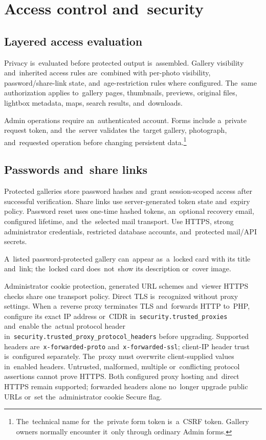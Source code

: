 \documentclass[11pt,a4paper]{article}
\newcommand{\codeword}[1]{\nolinkurl{#1}}
\begin{document}
\section{Access control and~security}
\label{sec:security}

\subsection{Layered access evaluation}

Privacy is~evaluated before protected output is~assembled. Gallery visibility
and~inherited access rules are~combined with per-photo visibility,
password/share-link state, and~age-restriction rules where configured. The~same
authorization applies to~gallery pages, thumbnails, previews, original files,
lightbox metadata, maps, search results, and~downloads.

Admin operations require an~authenticated account. Forms include a~private
request token, and~the~server validates the~target gallery, photograph,
and~requested operation before changing persistent data.\footnote{The~technical
name for~the~private form token is~a~CSRF token. Gallery owners normally
encounter it~only through ordinary Admin forms.}

\subsection{Passwords and~share links}

Protected galleries store password hashes and~grant session-scoped access after
successful verification. Share links use server-generated token state and~expiry
policy. Password reset uses one-time hashed tokens, an~optional recovery email,
configured lifetime, and~the~selected mail transport. Use HTTPS, strong
administrator credentials, restricted database accounts, and~protected mail/API
secrets.

A~listed password-protected gallery can~appear as~a~locked card with its title
and~link; the~locked card does~not~show its description or~cover image.

Administrator cookie protection, generated URL schemes and~viewer HTTPS checks
share one transport policy. Direct TLS is~recognized without proxy settings.
When a~reverse proxy terminates TLS and~forwards HTTP to~PHP, configure its
exact IP address or~CIDR in~\codeword{security.trusted_proxies} and~enable
the~actual protocol header in~\codeword{security.trusted_proxy_protocol_headers}
before upgrading. Supported headers are~\codeword{x-forwarded-proto}
and~\codeword{x-forwarded-ssl}; client-IP header trust is~configured separately.
The~proxy must overwrite client-supplied values in~enabled headers. Untrusted,
malformed, multiple or~conflicting protocol assertions cannot prove HTTPS. Both
configured proxy hosting and~direct HTTPS remain supported; forwarded headers
alone no~longer upgrade public URLs or~set the~administrator cookie Secure flag.
\end{document}
